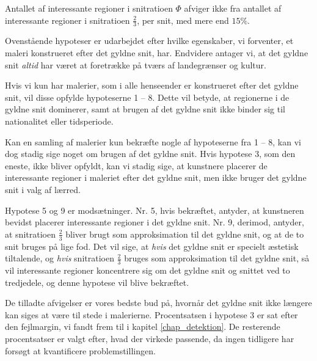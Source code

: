 {\begin{hypotese}
    Antallet af interessante regioner i snitratioen $\varPhi$ afviger
    ikke fra antallet af interessante regioner i snitratioen
    $\frac{2}{3}$, per snit, med mere end $15 \%$.
    \label{hypo_15p}
\end{hypotese}

Ovenstående hypoteser er udarbejdet efter hvilke egenskaber, vi
forventer, et maleri konstrueret efter det gyldne snit, har. Endvidere
antager vi, at det gyldne snit \emph{altid} har været at foretrække på
tværs af landegrænser og kultur.

Hvis vi kun har malerier, som i alle henseender er konstrueret efter det
gyldne snit, vil disse opfylde hypoteserne 1 -- 8. Dette vil betyde, at
regionerne i de gyldne snit dominerer, samt at brugen af det gyldne snit
ikke binder sig til nationalitet eller tidsperiode.

Kan en samling af malerier kun bekræfte nogle af hypoteserne fra 1 -- 8,
kan vi dog stadig sige noget om brugen af det gyldne snit. Hvis hypotese
3, som den eneste, ikke bliver opfyldt, kan vi stadig sige, at kunstnere
placerer de interessante regioner i maleriet efter det gyldne snit, men
ikke bruger det gyldne snit i valg af lærred.

Hypotese 5 og 9 er modsætninger. Nr. 5, hvis bekræftet, antyder, at
kunstneren bevidst placerer interessante regioner i det gyldne snit. Nr.
9, derimod, antyder, at snitratioen $\frac{2}{3}$ bliver brugt som
approksimation til det gyldne snit, og at de to snit bruges på lige fod.
Det vil sige, at \emph{hvis} det gyldne snit er specielt æstetisk
tiltalende, og \emph{hvis} snitratioen $\frac{2}{3}$ bruges som
approksimation til det gyldne snit, så vil interessante regioner
koncentrere sig om det gyldne snit og snittet ved to tredjedele, og
denne hypotese vil blive bekræftet.

De tilladte afvigelser er vores bedste bud på, hvornår det gyldne snit
ikke længere kan siges at være til stede i malerierne. Procentsatsen i
hypotese 3 er sat efter den fejlmargin, vi fandt frem til i kapitel
\ref{chap_detektion}. De resterende procentsatser er valgt efter, hvad
der virkede passende, da ingen tidligere har forsøgt at kvantificere
problemstillingen.

}
